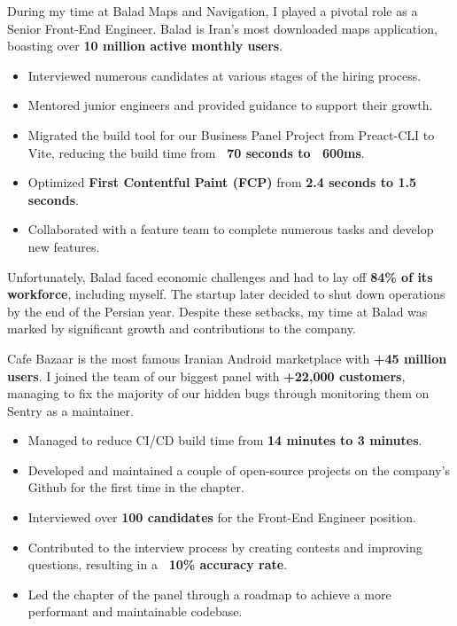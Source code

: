 During my time at Balad Maps and Navigation, I played a pivotal role as a Senior Front-End Engineer. Balad is Iran's most downloaded maps application, boasting over \textbf{10 million active monthly users}.
\medskip
\begin{itemize}
    \item Interviewed numerous candidates at various stages of the hiring process.
    \item Mentored junior engineers and provided guidance to support their growth.
    \item Migrated the build tool for our Business Panel Project from Preact-CLI to Vite, reducing the build time from \textbf{~70 seconds to ~600ms}.
    \item Optimized \textbf{First Contentful Paint (FCP)} from \textbf{2.4 seconds to 1.5 seconds}.
    \item Collaborated with a feature team to complete numerous tasks and develop new features.
\end{itemize}
Unfortunately, Balad faced economic challenges and had to lay off \textbf{84\% of its workforce}, including myself. The startup later decided to shut down operations by the end of the Persian year. Despite these setbacks, my time at Balad was marked by significant growth and contributions to the company.

\bigskip
\divider
\bigskip

Cafe Bazaar is the most famous Iranian Android marketplace with \textbf{+45 million users}. I joined the team of our biggest panel with \textbf{+22,000 customers}, managing to fix the majority of our hidden bugs through monitoring them on Sentry as a maintainer.
\medskip
\begin{itemize}
    \item Managed to reduce CI/CD build time from \textbf{14 minutes to 3 minutes}.
    \item Developed and maintained a couple of open-source projects on the company’s Github for the first time in the chapter.
    \item Interviewed over \textbf{100 candidates} for the Front-End Engineer position.
    \item Contributed to the interview process by creating contests and improving questions, resulting in a \textbf{~10\% accuracy rate}.
    \item Led the chapter of the panel through a roadmap to achieve a more performant and maintainable codebase.
\end{itemize}
